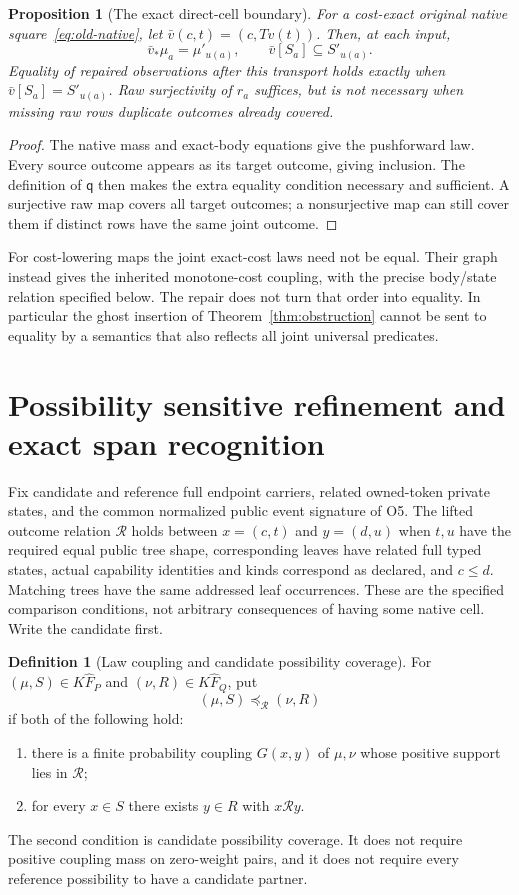 \documentclass[11pt,a4paper]{article}
\newtheorem{proposition}[theorem]{Proposition}
\theoremstyle{definition}
\newtheorem{definition}[theorem]{Definition}
\newcommand{\qobs}{\mathsf{q}}
\begin{document}
\begin{proposition}[The exact direct-cell boundary]\label{prop:direct-boundary}
For a cost-exact original native square~\eqref{eq:old-native}, let
$\bar v(c,t)=(c,Tv(t))$. Then, at each input,
\[
 \bar v_*\mu_a=\mu'_{u(a)},\qquad
 \bar v[S_a]\subseteq S'_{u(a)}.
\]
Equality of repaired observations after this transport holds exactly
when $\bar v[S_a]=S'_{u(a)}$. Raw surjectivity of $r_a$ suffices, but is
not necessary when missing raw rows duplicate outcomes already covered.
\end{proposition}
\begin{proof}
The native mass and exact-body equations give the pushforward law.
Every source outcome appears as its target outcome, giving inclusion.
The definition of $\qobs$ then makes the extra equality condition necessary
and sufficient. A surjective raw map covers all target outcomes; a
nonsurjective map can still cover them if distinct rows have the same
joint outcome.
\end{proof}
For cost-lowering maps the joint exact-cost laws need not be equal.
Their graph instead gives the inherited monotone-cost coupling, with
the precise body/state relation specified below. The repair does not
turn that order into equality. In particular the ghost insertion of
Theorem~\ref{thm:obstruction} cannot be sent to equality by a semantics
that also reflects all joint universal predicates.

\section{Possibility sensitive refinement and exact span recognition}
\label{sec:refinement}
Fix candidate and reference full endpoint carriers, related owned-token
private states, and the common normalized public event signature of O5.
The lifted outcome relation $\mathcal R$ holds between
$x=(c,t)$ and $y=(d,u)$ when $t,u$ have the required equal public tree
shape, corresponding leaves have related full typed states, actual
capability identities and kinds correspond as declared, and $c\leq d$.
Matching trees have the same addressed leaf occurrences. These are the
specified comparison conditions, not arbitrary consequences of having
some native cell. Write the candidate first.

\begin{definition}[Law coupling and candidate possibility coverage]
\label{def:refinement}
For $(\mu,S)\in K\widehat F_P$ and $(\nu,R)\in K\widehat F_Q$, put
\[
 (\mu,S)\preceq_{\mathcal R}(\nu,R)
\]
if both of the following hold:
\begin{enumerate}[label=\textup{(\roman*)}]
\item there is a finite probability coupling $G(x,y)$ of $\mu,\nu$
whose positive support lies in $\mathcal R$;
\item for every $x\in S$ there exists $y\in R$ with $x\mathcal R y$.
\end{enumerate}
The second condition is candidate possibility coverage. It does not
require positive coupling mass on zero-weight pairs, and it does not
require every reference possibility to have a candidate partner.
\end{definition}
\end{document}
